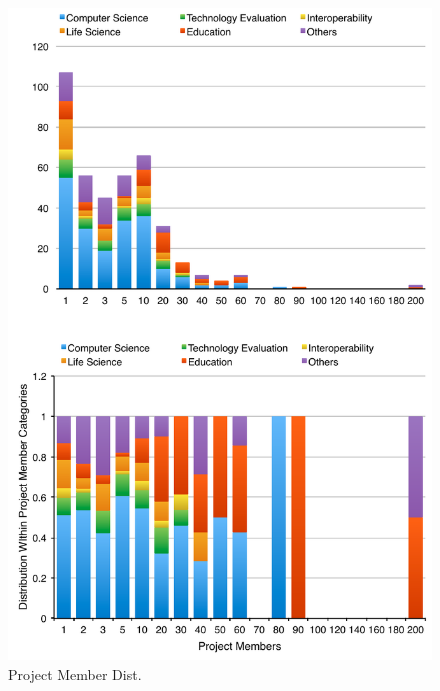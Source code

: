 \begin{figure}[htb]
  \centering
    \includegraphics[width=1.0\textwidth]{images/project-member-dist.pdf}
  \caption{Project Member Dist.}
\end{figure}

\afterpage{\clearpage}